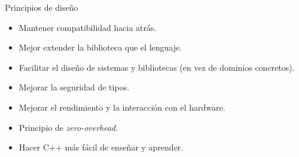 
\begin{frame}{Principios de diseño}
\begin{itemize}
  \item \pause  Mantener compatibilidad hacia atrás.
  \item \pause  Mejor extender la biblioteca que el lenguaje.
  \item \pause  Facilitar el diseño de sistemas y bibliotecas (en vez de dominios concretos).
  \item \pause  Mejorar la seguridad de tipos.
  \item \pause  Mejorar el rendimiento y la interacción con el hardware.
  \item \pause  Principio de \emph{zero-overhead}.
  \item \pause  Hacer C++ más fácil de enseñar y aprender.
\end{itemize}
\end{frame}

